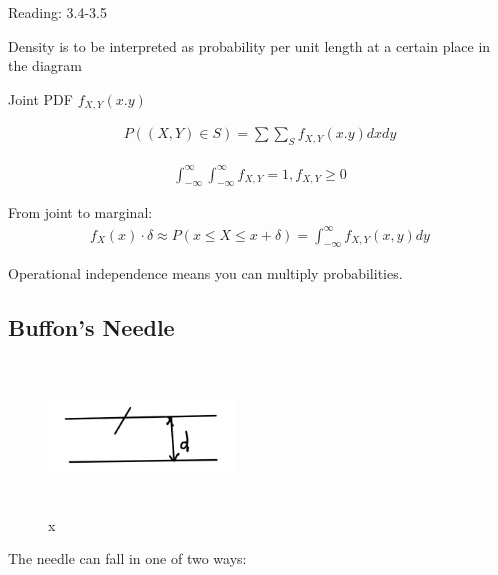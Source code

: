 

Reading: 3.4-3.5

 Density is to be interpreted as probability per unit length at a certain place in the diagram


Joint PDF $f_{X,Y}(x.y)$

\begin{align*}
P((X,Y) \in S) = \sum \sum_S f_{X,Y}(x.y)dx dy
\end{align*}

\begin{align*}
\int_{-\infty}^{\infty} \int_{-\infty}^{\infty} f_{X,Y} = 1, f_{X,Y} \ge 0
\end{align*}

From joint to marginal:
\begin{align*}
f_X(x) \cdot \delta \approx P(x \le X \le x + \delta) = \int_{-\infty}^{\infty} f_{X,Y}(x,y)dy
\end{align*}

 Operational independence means you can multiply probabilities.

\subsection{Buffon's Needle}


\begin{figure}[h]
\centering
\includegraphics[width=5cm, height=4cm]{images/L09/buffon0.jpeg}
\caption{x}
\end{figure}

The needle can fall in one of two ways:

